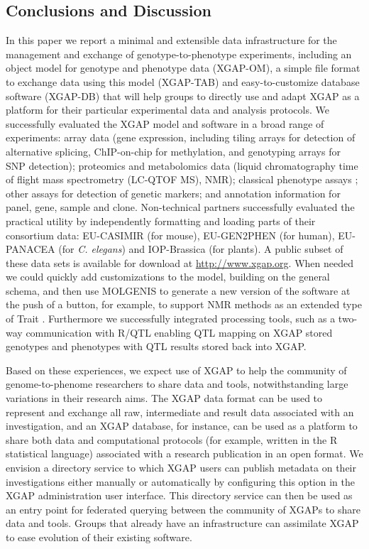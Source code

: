 \subsection{Conclusions and Discussion}
In this paper we report a minimal and extensible data infrastructure for the management and 
exchange of genotype-to-phenotype experiments, including an object model for genotype and 
phenotype data (XGAP-OM), a simple file format to exchange data using this model (XGAP-TAB) 
and easy-to-customize database software (XGAP-DB) that will help groups to directly use and 
adapt XGAP as a platform for their particular experimental data and analysis protocols. We 
successfully evaluated the XGAP model and software in a broad range of experiments: array 
data (gene expression, including tiling arrays for detection of alternative splicing, 
ChIP-on-chip for methylation, and genotyping arrays for SNP detection); proteomics and 
metabolomics data (liquid chromatography time of flight mass spectrometry (LC-QTOF MS), NMR); 
classical phenotype assays \cite{Heap:2009, Bystrykh:2005, Li:2006, Keurentjes:2006, Stranger:2007, Bailey:2008, Beamer:1999}; 
other assays for detection of genetic markers; and annotation information for panel, gene, 
sample and clone. Non-technical partners successfully evaluated the practical utility by 
independently formatting and loading parts of their consortium data: EU-CASIMIR (for mouse), EU-GEN2PHEN (for human), 
EU-PANACEA (for \emph{C. elegans}) and IOP-Brassica (for plants). A public subset of these data sets 
is available for download at \url{http://www.xgap.org}. When needed we could quickly add customizations to the 
model, building on the general schema, and then use MOLGENIS to generate a new version of the 
software at the push of a button, for example, to support NMR methods as an extended type of 
Trait \cite{Fu:2009}. Furthermore we successfully integrated processing tools, such as a two-way 
communication with R/QTL \cite{Broman:2003, Arends:2010} enabling QTL mapping on XGAP 
stored genotypes and phenotypes with QTL results stored back into XGAP.

Based on these experiences, we expect use of XGAP to help the community of genome-to-phenome 
researchers to share data and tools, notwithstanding large variations in their research aims. 
The XGAP data format can be used to represent and exchange all raw, intermediate and result 
data associated with an investigation, and an XGAP database, for instance, can be used as a 
platform to share both data and computational protocols (for example, written in the R 
statistical language) associated with a research publication in an open format. We envision 
a directory service to which XGAP users can publish metadata on their investigations either 
manually or automatically by configuring this option in the XGAP administration user interface. 
This directory service can then be used as an entry point for federated querying between the 
community of XGAPs to share data and tools. Groups that already have an infrastructure can 
assimilate XGAP to ease evolution of their existing software.

